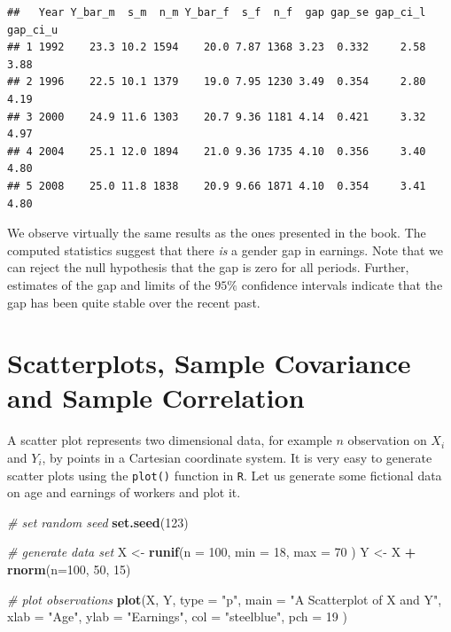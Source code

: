 \documentclass[]{book}
\newenvironment{Shaded}{\begin{snugshade}}{\end{snugshade}}
\newcommand{\KeywordTok}[1]{\textcolor[rgb]{0.13,0.29,0.53}{\textbf{#1}}}
\newcommand{\DataTypeTok}[1]{\textcolor[rgb]{0.13,0.29,0.53}{#1}}
\newcommand{\DecValTok}[1]{\textcolor[rgb]{0.00,0.00,0.81}{#1}}
\newcommand{\StringTok}[1]{\textcolor[rgb]{0.31,0.60,0.02}{#1}}
\newcommand{\CommentTok}[1]{\textcolor[rgb]{0.56,0.35,0.01}{\textit{#1}}}
\newcommand{\OperatorTok}[1]{\textcolor[rgb]{0.81,0.36,0.00}{\textbf{#1}}}
\newcommand{\NormalTok}[1]{#1}
\theoremstyle{definition}
\theoremstyle{definition}
\theoremstyle{definition}
\theoremstyle{remark}
\begin{document}
\begin{verbatim}
##   Year Y_bar_m  s_m  n_m Y_bar_f  s_f  n_f  gap gap_se gap_ci_l gap_ci_u
## 1 1992    23.3 10.2 1594    20.0 7.87 1368 3.23  0.332     2.58     3.88
## 2 1996    22.5 10.1 1379    19.0 7.95 1230 3.49  0.354     2.80     4.19
## 3 2000    24.9 11.6 1303    20.7 9.36 1181 4.14  0.421     3.32     4.97
## 4 2004    25.1 12.0 1894    21.0 9.36 1735 4.10  0.356     3.40     4.80
## 5 2008    25.0 11.8 1838    20.9 9.66 1871 4.10  0.354     3.41     4.80
\end{verbatim}

We observe virtually the same results as the ones presented in the book.
The computed statistics suggest that there \emph{is} a gender gap in
earnings. Note that we can reject the null hypothesis that the gap is
zero for all periods. Further, estimates of the gap and limits of the
\(95\%\) confidence intervals indicate that the gap has been quite
stable over the recent past.

\section{Scatterplots, Sample Covariance and Sample
Correlation}\label{scatterplots-sample-covariance-and-sample-correlation}

A scatter plot represents two dimensional data, for example \(n\)
observation on \(X_i\) and \(Y_i\), by points in a Cartesian coordinate
system. It is very easy to generate scatter plots using the
\texttt{plot()} function in \texttt{R}. Let us generate some fictional
data on age and earnings of workers and plot it.

\begin{Shaded}
\begin{Highlighting}[]
\CommentTok{# set random seed}
\KeywordTok{set.seed}\NormalTok{(}\DecValTok{123}\NormalTok{)}

\CommentTok{# generate data set}
\NormalTok{X <-}\StringTok{ }\KeywordTok{runif}\NormalTok{(}\DataTypeTok{n =} \DecValTok{100}\NormalTok{, }
           \DataTypeTok{min =} \DecValTok{18}\NormalTok{, }
           \DataTypeTok{max =} \DecValTok{70}
\NormalTok{           )}
\NormalTok{Y <-}\StringTok{ }\NormalTok{X }\OperatorTok{+}\StringTok{ }\KeywordTok{rnorm}\NormalTok{(}\DataTypeTok{n=}\DecValTok{100}\NormalTok{, }\DecValTok{50}\NormalTok{, }\DecValTok{15}\NormalTok{)}

\CommentTok{# plot observations}
\KeywordTok{plot}\NormalTok{(X, }
\NormalTok{     Y, }
     \DataTypeTok{type =} \StringTok{"p"}\NormalTok{,}
     \DataTypeTok{main =} \StringTok{"A Scatterplot of X and Y"}\NormalTok{,}
     \DataTypeTok{xlab =} \StringTok{"Age"}\NormalTok{,}
     \DataTypeTok{ylab =} \StringTok{"Earnings"}\NormalTok{,}
     \DataTypeTok{col =} \StringTok{"steelblue"}\NormalTok{,}
     \DataTypeTok{pch =} \DecValTok{19}
\NormalTok{     )}
\end{Highlighting}
\end{Shaded}
\end{document}
